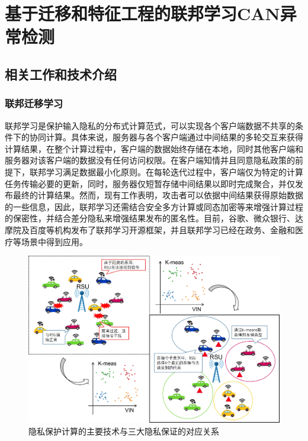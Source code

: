 \setlength{\baselineskip}{20pt}
\chapter{基于迁移和特征工程的联邦学习CAN异常检测}
\label{cha:chap3}

\section{相关工作和技术介绍}

\subsection{联邦迁移学习}
联邦学习是保护输入隐私的分布式计算范式，可以实现各个客户端数据不共享的条件下的协同计算。具体来说，服务器与各个客户端通过中间结果的多轮交互来获得计算结果，在整个计算过程中，客户端的数据始终存储在本地，同时其他客户端和服务器对该客户端的数据没有任何访问权限。在客户端知情并且同意隐私政策的前提下，联邦学习满足数据最小化原则。在每轮迭代过程中，客户端仅为特定的计算任务传输必要的更新，同时，服务器仅短暂存储中间结果以即时完成聚合，并仅发布最终的计算结果。然而，现有工作表明，攻击者可以依据中间结果获得原始数据的一些信息，因此，联邦学习还需结合安全多方计算或同态加密等来增强计算过程的保密性，并结合差分隐私来增强结果发布的匿名性。目前，谷歌、微众银行、达摩院及百度等机构发布了联邦学习开源框架，并且联邦学习已经在政务、金融和医疗等场景中得到应用。

\begin{figure}[htb]
\centering
    \includegraphics[scale=0.5]{figures/figure1.jpg}
    \caption{隐私保护计算的主要技术与三大隐私保证的对应关系}
    \label{fig:Cluster the cars in the region}
\end{figure}

